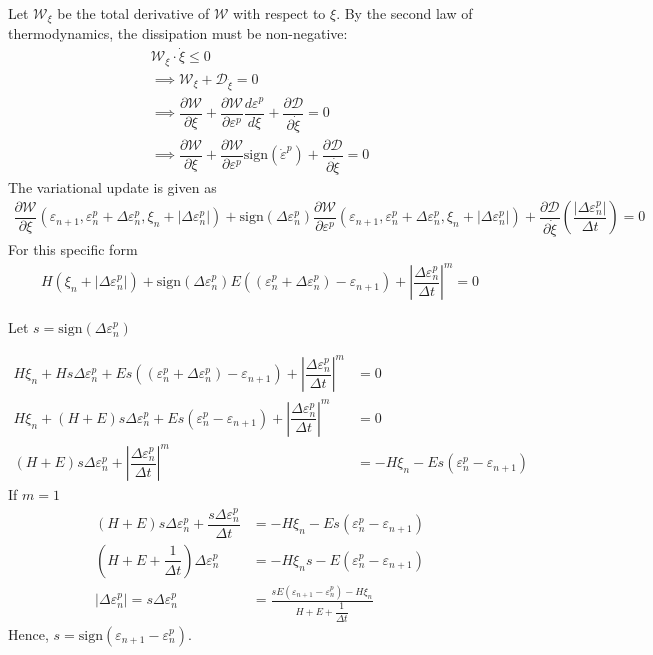 \documentclass[11pt]{article}
\begin{document}
Let $\mathcal{W}_\xi$ be the total derivative of $\mathcal{W}$ with respect to $\xi$. By the second law of thermodynamics, the dissipation must be non-negative:
\begin{align}
\mathcal{W}_{\xi} \cdot \dot{\xi} \leq 0\\
\implies \mathcal{W}_\xi + \mathcal{D}_{\dot{\xi}} = 0\\
\implies \dfrac{\partial \mathcal{W}}{\partial \xi} + \dfrac{\partial \mathcal{W}}{\partial \varepsilon^p}\dfrac{d \varepsilon^p}{d \xi} + \dfrac{\partial \mathcal{D}}{\partial \dot{\xi}} = 0\\
\implies \dfrac{\partial \mathcal{W}}{\partial \xi} + \dfrac{\partial \mathcal{W}}{\partial \varepsilon^p}\mathrm{sign}(\dot{\varepsilon}^p) + \dfrac{\partial \mathcal{D}}{\partial \dot{\xi}} = 0
\end{align}
The variational update is given as 
\begin{align}
\dfrac{\partial \mathcal{W}}{\partial \xi}(\varepsilon_{n+1}, \varepsilon^p_n +\Delta \varepsilon^p_{n}, \xi_n + |\Delta \varepsilon^p_n|) + \mathrm{sign}(\Delta \varepsilon^p_n)\dfrac{\partial \mathcal{W}}{\partial \varepsilon^p} (\varepsilon_{n+1}, \varepsilon^p_n +\Delta \varepsilon^p_{n}, \xi_n + |\Delta \varepsilon^p_n|) + \dfrac{\partial \mathcal{D}}{\partial \dot{\xi}}\left(\dfrac{|\Delta \varepsilon^p_n|}{\Delta t}\right) = 0 
\end{align}
For this specific form 
\begin{align}
H (\xi_n + |\Delta \varepsilon^p_n|) + \mathrm{sign}(\Delta \varepsilon^p_n) E((\varepsilon^p_n + \Delta \varepsilon^p_n) - \varepsilon_{n+1}) + \left|\dfrac{\Delta \varepsilon_n^p}{\Delta t} \right|^m= 0
\end{align}


Let $ s = \mathrm{sign}(\Delta \varepsilon^p_n) $

\begin{align}
H \xi_n  + H s\Delta \varepsilon^p_n + Es( (\varepsilon^p_n + \Delta \varepsilon^p_n) - \varepsilon_{n+1}) + \left|\dfrac{\Delta \varepsilon_n^p}{\Delta t} \right|^m &= 0\\
H \xi_n + (H + E)s \Delta \varepsilon^p_n + Es(\varepsilon^p_n - \varepsilon_{n+1}) + \left|\dfrac{\Delta \varepsilon_n^p}{\Delta t} \right|^m &= 0\\
(H+E)s \Delta \varepsilon^p_n + \left|\dfrac{\Delta \varepsilon_n^p}{\Delta t} \right|^m &= - H \xi_n   - Es(\varepsilon^p_n - \varepsilon_{n+1}) 
\end{align}
If $m=1$ 
\begin{align}
(H+E) s\Delta \varepsilon^p_n + \dfrac{ s \Delta \varepsilon_n^p}{\Delta t} &= - H \xi_n  - Es(\varepsilon^p_n - \varepsilon_{n+1}) \\
(H + E + \dfrac{1}{\Delta t}) \Delta \varepsilon^p_n &= - H \xi_n s   - E(\varepsilon^p_n - \varepsilon_{n+1}) \\
|\Delta \varepsilon_n^p|=s\Delta \varepsilon^p_n &= \frac{ sE(\varepsilon_{n+1}-\varepsilon^p_n) - H \xi_n  }{H + E + \dfrac{1}{\Delta t}}
\end{align}
Hence, $ s = \mathrm{sign}(\varepsilon_{n+1}-\varepsilon^p_n) $.
\end{document}
